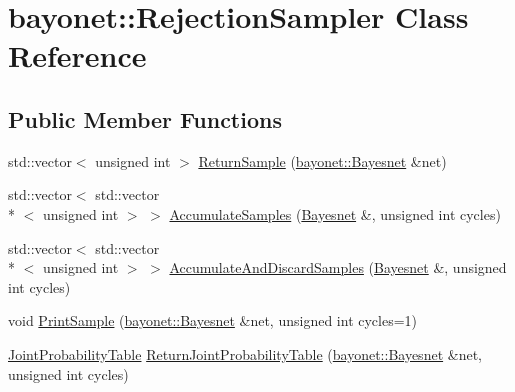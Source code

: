 \hypertarget{classbayonet_1_1_rejection_sampler}{\section{bayonet\-:\-:Rejection\-Sampler Class Reference}
\label{classbayonet_1_1_rejection_sampler}
}
\subsection*{Public Member Functions}
\begin{DoxyCompactItemize}
\item 
std\-::vector$<$ unsigned int $>$ \hyperlink{classbayonet_1_1_rejection_sampler_a1f2c685367f549965dcafd9c1b77ab1e}{Return\-Sample} (\hyperlink{classbayonet_1_1_bayesnet}{bayonet\-::\-Bayesnet} \&net)
\item 
std\-::vector$<$ std\-::vector\\*
$<$ unsigned int $>$ $>$ \hyperlink{classbayonet_1_1_rejection_sampler_aa5d0525c10cba1a99fba9e4233d8ac30}{Accumulate\-Samples} (\hyperlink{classbayonet_1_1_bayesnet}{Bayesnet} \&, unsigned int cycles)
\item 
std\-::vector$<$ std\-::vector\\*
$<$ unsigned int $>$ $>$ \hyperlink{classbayonet_1_1_rejection_sampler_ab63d7fa72ea2f9e8dfcd5f873d257df4}{Accumulate\-And\-Discard\-Samples} (\hyperlink{classbayonet_1_1_bayesnet}{Bayesnet} \&, unsigned int cycles)
\item 
void \hyperlink{classbayonet_1_1_rejection_sampler_ab68ff90b1c015d6aa2d185cacb18a74d}{Print\-Sample} (\hyperlink{classbayonet_1_1_bayesnet}{bayonet\-::\-Bayesnet} \&net, unsigned int cycles=1)
\item 
\hyperlink{classbayonet_1_1_joint_probability_table}{Joint\-Probability\-Table} \hyperlink{classbayonet_1_1_rejection_sampler_a0ba74f6d5f5fd61baa968464e2e3aac5}{Return\-Joint\-Probability\-Table} (\hyperlink{classbayonet_1_1_bayesnet}{bayonet\-::\-Bayesnet} \&net, unsigned int cycles)
\end{DoxyCompactItemize}


